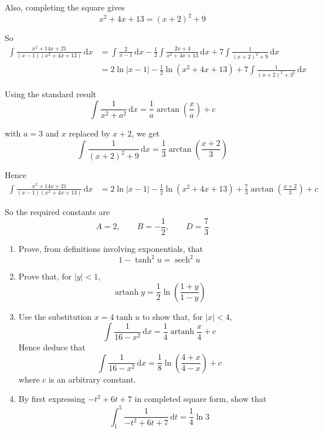 \documentclass[leqno]{article}
\begin{document}
\begin{enumerate}[
  label=\textbf{\arabic*.},
  leftmargin=*,
  topsep=0pt,
  partopsep=0pt,
  parsep=0pt
]
\begin{djsSolution}
Also, completing the square gives
\[
x^2+4x+13=(x+2)^2+9
\]

So
\begin{align*}
\int \frac{x^2+14x+21}{(x-1)(x^2+4x+13)}\,\mathrm{d}x
&=\int \frac{2}{x-1}\,\mathrm{d}x
-\frac12\int \frac{2x+4}{x^2+4x+13}\,\mathrm{d}x
+7\int \frac{1}{(x+2)^2+9}\,\mathrm{d}x \\
&=2\ln|x-1|-\frac12\ln(x^2+4x+13)+7\int \frac{1}{(x+2)^2+3^2}\,\mathrm{d}x
\end{align*}

Using the standard result
\[
\int \frac{1}{x^2+a^2}\,\mathrm{d}x=\frac{1}{a}\arctan\left(\frac{x}{a}\right)+c
\]

with $a=3$ and $x$ replaced by $x+2$, we get
\[
\int \frac{1}{(x+2)^2+9}\,\mathrm{d}x
=\frac13\arctan\left(\frac{x+2}{3}\right)
\]

Hence
\begin{align*}
\int \frac{x^2+14x+21}{(x-1)(x^2+4x+13)}\,\mathrm{d}x
&=2\ln|x-1|-\frac12\ln(x^2+4x+13)+\frac73\arctan\left(\frac{x+2}{3}\right)+c
\end{align*}

So the required constants are
\[
A=2,\qquad B=-\frac12,\qquad D=\frac73
\]
\end{djsSolution}


\newpage

\questionitem

\begin{enumerate}[label=(\roman*)]
  \item Prove, from definitions involving exponentials, that
  \[
  1-\tanh^2u=\operatorname{sech}^2u
  \]
  \item Prove that, for $|y|<1$,
  \[
  \operatorname{artanh}y=\frac{1}{2}\ln\left(\frac{1+y}{1-y}\right)
  \]
  \item Use the substitution $x=4\tanh u$ to show that, for $|x|<4$,
  \[
  \int \frac{1}{16-x^2}\,\mathrm{d}x=\frac{1}{4}\operatorname{artanh}\frac{x}{4}+c
  \]
  Hence deduce that
  \[
  \int \frac{1}{16-x^2}\,\mathrm{d}x=\frac{1}{8}\ln\left(\frac{4+x}{4-x}\right)+c
  \]
  where $c$ is an arbitrary constant.  \\
  \item By first expressing $-t^2+6t+7$ in completed square form, show that
  \[
  \int_{1}^{5} \frac{1}{-t^2+6t+7}\,\mathrm{d}t=\frac{1}{4}\ln 3
  \]
\end{enumerate}


\end{enumerate}
\end{document}
